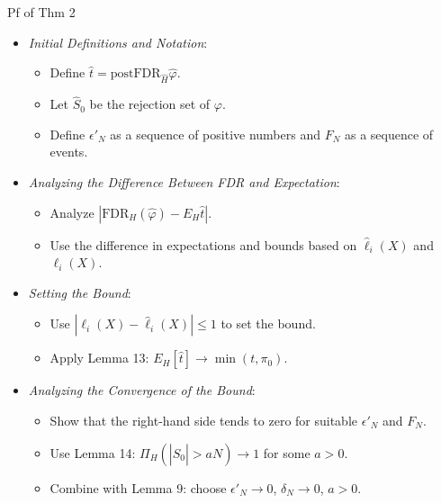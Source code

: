 \documentclass[10pt, aspectratio=169]{beamer}
\begin{document}
\begin{frame}{Pf of Thm 2}

    \begin{itemize}[label=\scalebox{0.5}{$\bullet$}]
        \setlength{\itemsep}{\baselineskip}
        \item \textit{Initial Definitions and Notation}:
            \begin{itemize}[label=\scalebox{0.5}{$\bullet$}]
                \setlength{\itemsep}{\baselineskip}
                \item Define \(\hat{t} = \text{postFDR}_{\hat{H}} \hat{\varphi}\).
                \item Let \(\hat{S}_0\) be the rejection set of \(\varphi\).
                \item Define \(\epsilon'_N\) as a sequence of positive numbers and \(F_N\) as a sequence of events.
            \end{itemize}

        \item \textit{Analyzing the Difference Between FDR and Expectation}:
            \begin{itemize}[label=\scalebox{0.5}{$\bullet$}]
                \setlength{\itemsep}{\baselineskip}
                \item Analyze \(|\text{FDR}_{H}(\hat{\varphi}) - E_{H} \hat{t}|\).
                \item Use the difference in expectations and bounds based on \(\hat{\ell}_i(X)\) and \(\ell_i(X)\).
            \end{itemize}
    \end{itemize}

\end{frame}
\begin{frame}
\begin{itemize}[label=\scalebox{0.5}{$\bullet$}]
    \item \textit{Setting the Bound}:
            \begin{itemize}[label=\scalebox{0.5}{$\bullet$}]
                \setlength{\itemsep}{\baselineskip}
                \item Use \(| \ell_i(X) - \hat{\ell}_i(X) | \leq 1\) to set the bound.
                \item Apply Lemma 13: \(E_{H}[\hat{t}] \to \min(t, \pi_0)\).
            \end{itemize}

        \item \textit{Analyzing the Convergence of the Bound}:
            \begin{itemize}[label=\scalebox{0.5}{$\bullet$}]
                \setlength{\itemsep}{\baselineskip}
                \item Show that the right-hand side tends to zero for suitable \(\epsilon'_N\) and \(F_N\).
                \item Use Lemma 14: \( \Pi_{H}(|\hat{S}_0| > aN) \to 1 \) for some \(a > 0\).
                \item Combine with Lemma 9: choose \(\epsilon'_N \to 0\), \(\delta_N \to 0\), \(a > 0\).
            \end{itemize}
\end{itemize}
\end{frame}
\end{document}
